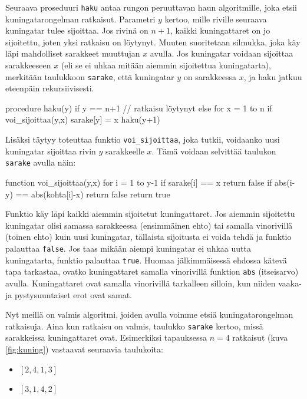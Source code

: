 Seuraava proseduuri \texttt{haku} antaa rungon peruuttavan haun
algoritmille, joka etsii kuningatarongelman ratkaisut.
Parametri $y$ kertoo, mille riville seuraava kuningatar tulee sijoittaa.
Jos rivinä on $n+1$, kaikki kuningattaret on jo sijoitettu,
joten yksi ratkaisu on löytynyt.
Muuten suoritetaan silmukka, joka käy läpi mahdolliset sarakkeet
muuttujan $x$ avulla.
Jos kuningatar voidaan sijoittaa sarakkeeseen $x$
(eli se ei uhkaa mitään aiemmin sijoitettua kuningatarta),
merkitään taulukkoon \texttt{sarake},
että kuningatar $y$ on sarakkeessa $x$,
ja haku jatkuu eteenpäin rekursiivisesti.

\begin{code}
procedure haku(y)
    if y == n+1
        // ratkaisu löytynyt
    else
        for x = 1 to n
            if voi_sijoittaa(y,x)
                sarake[y] = x
                haku(y+1)
\end{code}

Lisäksi täytyy toteuttaa funktio \texttt{voi\_sijoittaa},
joka tutkii, voidaanko uusi kuningatar sijoittaa
rivin $y$ sarakkeelle $x$.
Tämä voidaan selvittää taulukon \texttt{sarake} avulla näin:

\begin{code}
function voi_sijoittaa(y,x)
    for i = 1 to y-1
        if sarake[i] == x
            return false
        if abs(i-y) == abs(kohta[i]-x)
            return false
    return true
\end{code}

Funktio käy läpi kaikki aiemmin sijoitetut kuningattaret.
Jos aiemmin sijoitettu kuningatar olisi samassa sarakkeessa
(ensimmäinen ehto) tai samalla vinorivillä (toinen ehto)
kuin uusi kuningatar, tällaista sijoitusta ei voida tehdä
ja funktio palauttaa \texttt{false}.
Jos taas mikään aiempi kuningatar ei uhkaa uutta kuningatarta,
funktio palauttaa \texttt{true}.
Huomaa jälkimmäisessä ehdossa kätevä tapa tarkastaa,
ovatko kuningattaret samalla vinorivillä funktion \texttt{abs}
(itseisarvo) avulla.
Kuningattaret ovat samalla vinorivillä tarkalleen silloin,
kun niiden vaaka- ja pystysuuntaiset erot ovat samat.

Nyt meillä on valmis algoritmi, joiden avulla voimme etsiä
kuningatarongelman ratkaisuja.
Aina kun ratkaisu on valmis, taulukko \texttt{sarake} kertoo,
missä sarakkeissa kuningattaret ovat.
Esimerkiksi tapauksessa $n=4$ ratkaisut (kuva \ref{fig:kuning})
vastaavat seuraavia taulukoita:

\begin{itemize}
\item $[2,4,1,3]$
\item $[3,1,4,2]$
\end{itemize}

